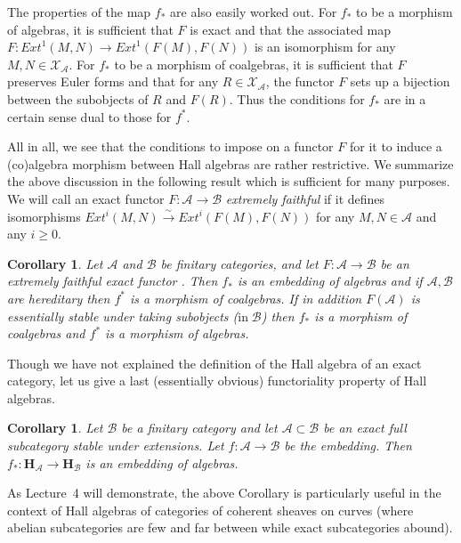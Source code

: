 \documentclass[a4paper,10pt]{amsart}
\def\H{\mathbf{H}}
\def\A{\mathcal{A}}
\newtheorem{cor}[theo]{Corollary}
\numberwithin{equation}{section}
\begin{document}
\vspace{.1in}

The properties of the map $f_*$ are also easily worked out. For $f_*$ to be a morphism of algebras, it is sufficient that $F$ is exact and that the associated map $F: {Ext}^1(M,N) \to {Ext}^1(F(M),F(N))$ is an isomorphism for any $M,N \in \mathcal{X}_{\A}$. For $f_*$ to be a morphism of coalgebras, it is sufficient that $F$ preserves Euler forms and that for any $R \in \mathcal{X}_{\A}$, the functor $F$ sets up a bijection between the subobjects of $R$ and $F(R)$. Thus the conditions for $f_*$ are in a certain sense dual to those for $f^*$.

\vspace{.15in}

All in all, we see that the conditions to impose on a functor $F$ for it to induce a (co)algebra morphism between Hall algebras are rather restrictive. We summarize the above discussion in the following result which is sufficient for many purposes. We will call an exact functor $F: \A \to \mathcal{B}$ \textit{extremely faithful} if it defines isomorphisms $Ext^i(M,N) \stackrel{\sim}{\to} Ext^i(F(M),F(N))$ for any $M,N \in \A$ and any $i \geq 0$.

\begin{cor}\label{C:cathall} Let $\mathcal{A}$ and $\mathcal{B}$ be finitary categories, and let $F: \A \to \mathcal{B}$ be an extremely faithful exact functor . Then $f_*$ is an embedding of algebras and if $\A, \mathcal{B}$ are hereditary then $f^*$ is a morphism of coalgebras. If in addition $F(\mathcal{A})$ is essentially stable under taking subobjects ($\mathrm{in}\;\mathcal{B}$) then $f_*$ is a morphism of coalgebras and $f^*$ is a morphism of algebras. \end{cor}

\vspace{.2in}

Though we have not explained the definition of the Hall algebra of an exact category, let us give a last (essentially obvious) functoriality property of Hall algebras.

\begin{cor}\label{C:catexacthall} Let $\mathcal{B}$ be a finitary category and let $\mathcal{A} \subset \mathcal{B}$ be an exact full subcategory stable under extensions. Let $f: \mathcal{A} \to \mathcal{B}$ be the embedding. Then $f_*: \H_{\A} \to \H_{\mathcal{B}}$ is an embedding of algebras.
\end{cor}

As Lecture~4 will demonstrate, the above Corollary is particularly useful in the context of Hall algebras of categories of coherent sheaves on curves (where abelian subcategories are few and far between while exact subcategories abound).
\end{document}
